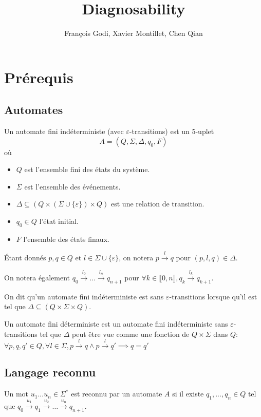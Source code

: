 \documentclass[10pt,a4paper]{article}
\newcommand{\enum}[2]{\llbracket #1, #2 \rrbracket}
\begin{document}
    \title{Diagnosability}

    \author{François Godi, Xavier Montillet, Chen Qian}

\section{Pr\'erequis}

\subsection{Automates}

Un automate fini indéterministe (avec $\varepsilon$-transitions) est un 5-uplet
$$A = (Q, \Sigma, \Delta, q_0, F)$$
o\`u
\begin{itemize}
	\item $Q$ est l'ensemble fini des états du système.
	\item $\Sigma$ est l'ensemble des événements.
	\item $\Delta \subseteq (Q \times (\Sigma \cup \{\varepsilon\}) \times Q)$ est une relation de transition.
	\item $q_0 \in Q$ l'état initial.
	\item $F$ l'ensemble des \'etats finaux.
\end{itemize}

\'Etant donn\'es $p,q \in Q$ et $l\in \Sigma \cup \{\varepsilon\}$, on notera $p \overset{l}{{\to}}q$ pour $(p,l,q) \in \Delta$.

On notera \'egalement $q_0 \overset{l_0}{{\to}} \dots \overset{l_n}{{\to}} q_{n+1}$ pour $\forall k \in \enum{0}{n}, q_k \overset{l_k}{{\to}} q_{k+1}$.



On dit qu'un automate fini ind\'eterministe est sans $\varepsilon$-transitions lorsque qu'il est tel que  $\Delta \subseteq (Q\times \Sigma \times Q)$.

Un automate fini d\'eterministe est un automate fini ind\'eterministe sans $\varepsilon$-transitions tel que $\Delta$ peut \^etre vue comme une fonction de $Q\times \Sigma$ dans $Q$: $\forall p,q,q' \in Q, \forall l \in \Sigma, p\overset{l}{{\to}}q \land p\overset{l}{{\to}}q' \implies q=q'$

\subsection{Langage reconnu}

Un mot $u_1...u_n \in \Sigma^*$ est reconnu par un automate $A$ si il existe $q_1,...,q_n \in Q$ tel que $q_0 \overset{u_1}{{\to}} q_1 \overset{u_2}{{\to}} \dots \overset{u_n}{{\to}} q_{n+1}$.
\end{document}
